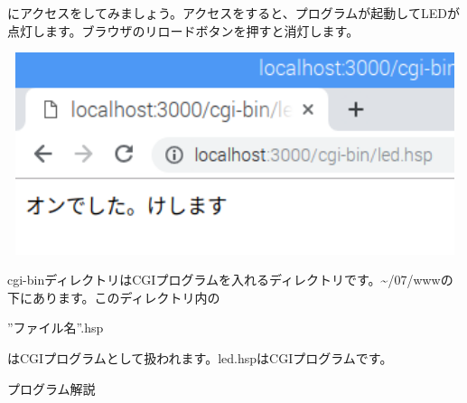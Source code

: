 \documentclass[a4paper,12pt,dvipdfmx]{jarticle}
\begin{document}
にアクセスをしてみましょう。アクセスをすると、プログラムが起動してLEDが点灯します。ブラウザのリロードボタンを押すと消灯します。

\centering
\includegraphics[width=16.166cm,height=5.911cm]{ome7-img052.png}
\flushleft

cgi-binディレクトリはCGIプログラムを入れるディレクトリです。\~{}/07/wwwの下にあります。このディレクトリ内の

”ファイル名”.hsp

はCGIプログラムとして扱われます。led.hspはCGIプログラムです。


\bigskip

\clearpage
プログラム解説
\end{document}
